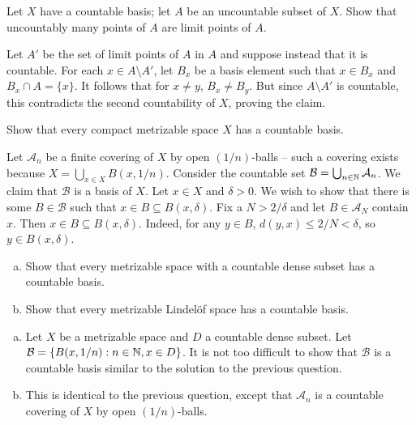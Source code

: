 	\begin{exercise}
		Let $X$ have a countable basis; let $A$ be an uncountable subset of $X$. Show that uncountably many points of $A$ are limit points of $A$.
	\end{exercise}
	\begin{solution*}
		Let $A'$ be the set of limit points of $A$ in $A$ and suppose instead that it is countable. For each $x\in A\setminus A'$, let $B_x$ be a basis element such that $x\in B_x$ and $B_x\cap A = \{x\}$. It follows that for $x\neq y$, $B_x\neq B_y$. But since $A\setminus A'$ is countable, this contradicts the second countability of $X$, proving the claim.
	\end{solution*}

	\begin{exercise}
		Show that every compact metrizable space $X$ has a countable basis.
	\end{exercise}
	\begin{solution*}
		Let $\mathcal{A}_n$ be a finite covering of $X$ by open $(1/n)$-balls -- such a covering exists because $X = \bigcup_{x\in X} B(x,1/n)$. Consider the countable set $\mathcal{B} = \bigcup_{n\in\mathbb{N}} \mathcal{A}_n$. We claim that $\mathcal{B}$ is a basis of $X$. Let $x\in X$ and $\delta>0$. We wish to show that there is some $B\in\mathcal{B}$ such that $x\in B\subseteq B(x,\delta)$. Fix a $N > 2/\delta$ and let $B \in \mathcal{A}_N$ contain $x$. Then $x \in B \subseteq B(x,\delta)$. Indeed, for any $y\in B$, $d(y,x) \leq 2/N < \delta$, so $y\in B(x,\delta)$.
	\end{solution*}

	\begin{exercise}
		\phantom{ah}
		\begin{enumerate}[(a)]
			\item Show that every metrizable space with a countable dense subset has a countable basis.
			\item Show that every metrizable Lindel\"{o}f space has a countable basis.
		\end{enumerate}
	\end{exercise}
	\begin{solution*}
		\begin{enumerate}[(a)]
			\item Let $X$ be a metrizable space and $D$ a countable dense subset. Let $\mathcal{B} = \{B(x,1/n) : n\in\mathbb{N}, x\in D\}$. It is not too difficult to show that $\mathcal{B}$ is a countable basis similar to the solution to the previous question.
			\item This is identical to the previous question, except that $\mathcal{A}_n$ is a countable covering of $X$ by open $(1/n)$-balls.
		\end{enumerate}
	\end{solution*}

